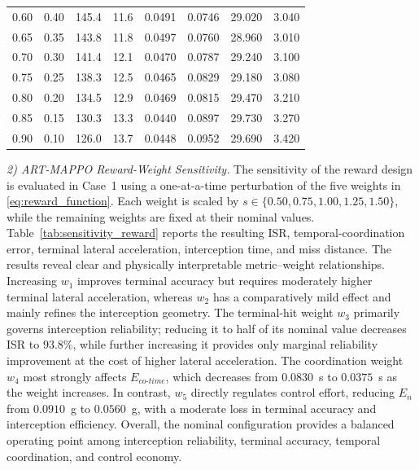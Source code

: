 \documentclass[lettersize,journal]{IEEEtran}
\begin{document}
\begin{table}[!t]
{{\begin{tabular}{@{}cccccccc@{}}
0.60 & 0.40 & 145.4 & 11.6 & 0.0491 & 0.0746 & 29.020 & 3.040 \\
0.65 & 0.35 & 143.8 & 11.8 & 0.0497 & 0.0760 & 28.960 & 3.010 \\
0.70 & 0.30 & 141.4 & 12.1 & 0.0470 & 0.0787 & 29.240 & 3.100 \\
0.75 & 0.25 & 138.3 & 12.5 & 0.0465 & 0.0829 & 29.180 & 3.080 \\
0.80 & 0.20 & 134.5 & 12.9 & 0.0469 & 0.0815 & 29.470 & 3.210 \\
0.85 & 0.15 & 130.3 & 13.3 & 0.0440 & 0.0897 & 29.730 & 3.270 \\
0.90 & 0.10 & 126.0 & 13.7 & 0.0448 & 0.0952 & 29.690 & 3.420 \\
\hline
\end{tabular}%
}}
\end{table}






\emph{2) ART-MAPPO Reward-Weight Sensitivity.}
The sensitivity of the reward design is evaluated in Case~1 using a
one-at-a-time perturbation of the five weights in
\eqref{eq:reward_function}. Each weight is scaled by
$s\in\{0.50,0.75,1.00,1.25,1.50\}$, while the remaining weights are fixed at
their nominal values. Table~\ref{tab:sensitivity_reward} reports the resulting
ISR, temporal-coordination error, terminal lateral acceleration, interception time, and
miss distance. The results reveal clear and physically interpretable
metric--weight relationships. Increasing $w_1$ improves terminal accuracy but
requires moderately higher terminal lateral acceleration, whereas $w_2$ has a comparatively
mild effect and mainly refines the interception geometry. The terminal-hit
weight $w_3$ primarily governs interception reliability; reducing it to half
of its nominal value decreases ISR to $93.8\%$, while further increasing it
provides only marginal reliability improvement at the cost of higher lateral acceleration.
The coordination weight $w_4$ most strongly affects
$E_{co\text{-}time}$, which decreases from $0.0830$~s to $0.0375$~s as the
weight increases. In contrast, $w_5$ directly regulates control effort,
reducing $E_n$ from $0.0910$~g to $0.0560$~g, with a moderate loss in terminal
accuracy and interception efficiency. Overall, the nominal configuration
provides a balanced operating point among interception reliability, terminal
accuracy, temporal coordination, and control economy.
\end{document}
